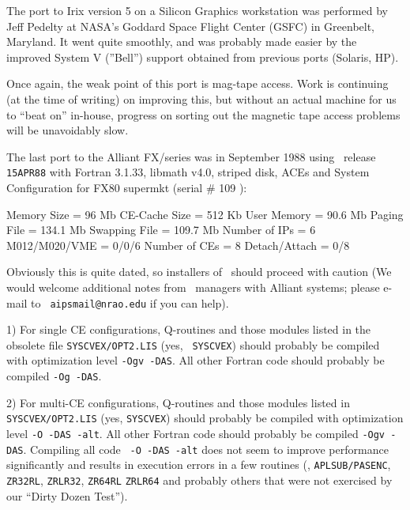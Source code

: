 {\medskip{}

The port to Irix version 5 on a Silicon Graphics workstation was performed
by Jeff Pedelty at NASA's Goddard Space Flight Center (GSFC) in Greenbelt,
Maryland.  It went quite smoothly, and was probably made easier by the
improved System V (''Bell'') support obtained from previous ports
(Solaris, HP).

Once again, the weak point of this port is mag-tape access.  Work is
continuing (at the time of writing) on improving this, but without an
actual machine for us to ``beat on'' in-house, progress on sorting out the
magnetic tape access problems will be unavoidably slow.


\medskip{}

The last port to the Alliant FX/series was in September 1988 using
\AIPS\ release {\tt 15APR88} with Fortran 3.1.33, libmath v4.0,
striped disk, ACEs and System Configuration for FX80 supermkt (serial
\# 109 ):

\medskip \fortran
   Memory Size   = 96 Mb
   CE-Cache Size = 512 Kb
   User Memory   = 90.6 Mb
   Paging File   = 134.1 Mb
   Swapping File = 109.7 Mb
   Number of IPs = 6
   M012/M020/VME = 0/0/6
   Number of CEs = 8
   Detach/Attach = 0/8
\endfortran

\medskip\noindent Obviously this is quite dated, so installers of
\thisver\ should proceed with caution (We would welcome additional
notes from \AIPS\ managers with Alliant systems; please e-mail to {\tt
aipsmail@nrao.edu} if you can help).

\item{1)} For single CE configurations, Q-routines and those modules
listed in the obsolete file {\tt \dol SYS\-CVEX/\-OPT2.LIS} (yes, {\tt
\dol SYSCVEX}) should probably be compiled with optimization level {\tt -Ogv
-DAS}.  All other Fortran code should probably be compiled {\tt -Og -DAS}.

\item{2)} For multi-CE configurations, Q-routines and those modules listed
in {\tt\dol SYSCVEX/OPT2.LIS} (yes, {\tt\dol SYSCVEX}) should probably be
compiled with optimization level {\tt -O -DAS -alt}.  All other Fortran
code should probably be compiled {\tt -Ogv -DAS}.  Compiling all code {\tt
-O -DAS -alt} does not seem to improve performance significantly and
results in execution errors in a few routines (\ie, {\tt\dol APLSUB/PASENC},
{\tt ZR32RL}, {\tt ZRLR32}, {\tt ZR64RL} {\tt ZRLR64} and probably others
that were not exercised by our ``Dirty Dozen Test'').

}
